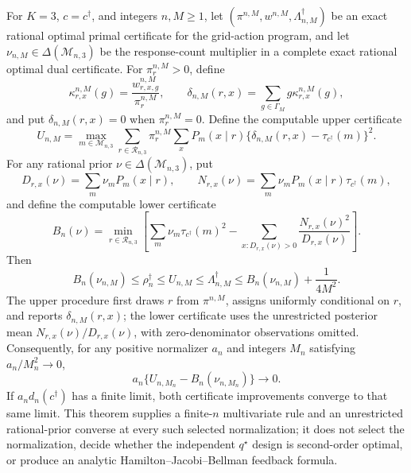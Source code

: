 For \(K=3\), \(c=c^\dagger\), and integers \(n,M\geq1\), let \((\pi^{n,M},w^{n,M},\Lambda_{n,M}^\dagger)\) be an exact rational optimal primal certificate for the grid-action program, and let \(\nu_{n,M}\in\Delta(\mathcal M_{n,3})\) be the response-count multiplier in a complete exact rational optimal dual certificate.  For \(\pi_r^{n,M}>0\), define
\[
 \kappa_{r,x}^{n,M}(g)=\frac{w_{r,x,g}^{n,M}}{\pi_r^{n,M}},
 \qquad
 \delta_{n,M}(r,x)=\sum_{g\in\Gamma_M}g\kappa_{r,x}^{n,M}(g),
\]
and put \(\delta_{n,M}(r,x)=0\) when \(\pi_r^{n,M}=0\).  Define the computable upper certificate
\[
 U_{n,M}=\max_{m\in\mathcal M_{n,3}}
 \sum_{r\in\mathcal R_{n,3}}\pi_r^{n,M}\sum_xP_m(x\mid r)
 \{\delta_{n,M}(r,x)-\tau_{c^\dagger}(m)\}^2.
\]
For any rational prior \(\nu\in\Delta(\mathcal M_{n,3})\), put
\[
 D_{r,x}(\nu)=\sum_m\nu_mP_m(x\mid r),
 \qquad
 N_{r,x}(\nu)=\sum_m\nu_mP_m(x\mid r)\tau_{c^\dagger}(m),
\]
and define the computable lower certificate
\[
 B_n(\nu)=\min_{r\in\mathcal R_{n,3}}
 \left[
 \sum_m\nu_m\tau_{c^\dagger}(m)^2-
 \sum_{x:D_{r,x}(\nu)>0}\frac{N_{r,x}(\nu)^2}{D_{r,x}(\nu)}
 \right].
\]
Then
\[
 B_n(\nu_{n,M})\leq\rho_n^\dagger\leq U_{n,M}
 \leq\Lambda_{n,M}^\dagger
 \leq B_n(\nu_{n,M})+\frac{1}{4M^2}.
\]
The upper procedure first draws \(r\) from \(\pi^{n,M}\), assigns uniformly conditional on \(r\), and reports \(\delta_{n,M}(r,x)\); the lower certificate uses the unrestricted posterior mean \(N_{r,x}(\nu)/D_{r,x}(\nu)\), with zero-denominator observations omitted.  Consequently, for any positive normalizer \(a_n\) and integers \(M_n\) satisfying \(a_n/M_n^2\to0\),
\[
 a_n\{U_{n,M_n}-B_n(\nu_{n,M_n})\}\longrightarrow0.
\]
If \(a_nd_n(c^\dagger)\) has a finite limit, both certificate improvements converge to that same limit.  This theorem supplies a finite-\(n\) multivariate rule and an unrestricted rational-prior converse at every such selected normalization; it does not select the normalization, decide whether the independent \(q^\star\) design is second-order optimal, or produce an analytic Hamilton--Jacobi--Bellman feedback formula.